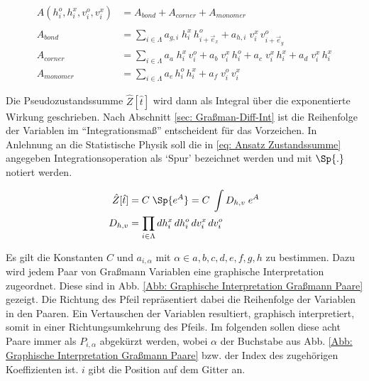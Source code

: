 \begin{equation} \label{eq: Ansatz Wirkung}
    \begin{aligned}
        A(h_{i}^o, h_{i}^x, v_{i}^o, v_{i}^x)  &= A_{bond} + A_{corner} + A_{monomer} \\
                 &\\
        A_{bond} &= \sum_{i \in \Lambda} a_{g,i} \; h_{i}^x \,h_{i+\vec{e}_x}^o
                                            + a_{h,i} \; v_{i}^x \,v_{i+\vec{e}_y}^o \\
        A_{corner} &= \sum_{i \in \Lambda} a_{a}\; h_{i}^x \,v_{i}^o 
                                            + a_{b}\; v_{i}^x\, h_{i}^o
                                            + a_{c}\; v_{i}^x \,h_{i}^x 
                                            + a_{d}\; v_{i}^x \,h_{i}^x\\
        A_{monomer} &= \sum_{i \in \Lambda} a_{e}\, h_{i}^o \,h_{i}^x
                                            + a_{f}\; v_{i}^o \,v_{i}^x
    \end{aligned}
\end{equation}

\noindent Die Pseudozustandssumme $\hat{Z}[\hat{t}]$ wird dann als Integral über die exponentierte Wirkung  geschrieben. Nach Abschnitt \ref{sec: Graßman-Diff-Int} ist die Reihenfolge der Variablen im ``Integrationsmaß'' entscheident für das Vorzeichen. In Anlehnung an die Statistische Physik soll die in \eqref{eq: Ansatz Zustandssumme} angegeben Integrationsoperation als `Spur' bezeichnet werden und mit $\Sp{.}$ notiert werden. 

\begin{equation} \label{eq: Ansatz Zustandssumme}
    \begin{aligned}
        \hat{Z}[\hat{t}] &= C\;\Sp{e^{A}} = C\;\int D_{h,v}\;e^{A}\\
        D_{h,v}& = \prod_{i \in \Lambda} dh_{i}^x\,dh_{i}^o\,dv_{i}^x\,dv_{i}^o \\
    \end{aligned}
\end{equation}

\noindent Es gilt die Konstanten $C$ und $a_{i, \alpha}$ mit $\alpha \in {a,b,c,d,e,f,g,h}$ zu bestimmen. Dazu wird jedem Paar von Graßmann Variablen eine graphische Interpretation zugeordnet. Diese sind in Abb. \ref{Abb: Graphische Interpretation Graßmann Paare} gezeigt. Die Richtung des Pfeil repräsentiert dabei die Reihenfolge der Variablen in den Paaren. Ein Vertauschen der Variablen resultiert, graphisch interpretiert, somit in einer Richtungsumkehrung des Pfeils. Im folgenden sollen diese acht Paare immer als $P_{i,\alpha}$ abgekürzt werden, wobei $\alpha$ der Buchstabe aus Abb. \ref{Abb: Graphische Interpretation Graßmann Paare} bzw. der Index des zugehörigen Koeffizienten ist. $i$ gibt die Position auf dem Gitter an.

